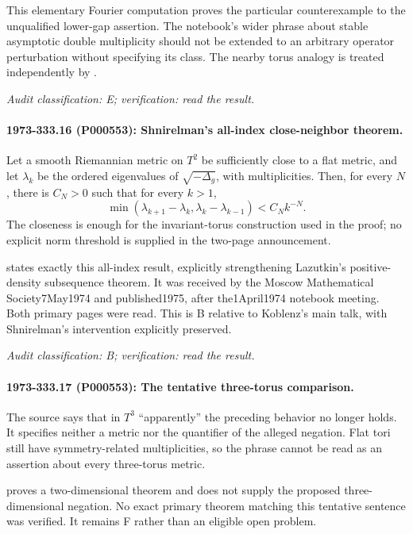 This elementary Fourier computation proves the particular counterexample to the unqualified lower-gap assertion. The notebook’s wider phrase about stable asymptotic double multiplicity should not be extended to an arbitrary operator perturbation without specifying its class. The nearby torus analogy is treated independently by \citet{shnirelman1975multiplicity}.

\emph{Audit classification: E; verification: read the result.}

\paragraph{1973-333.16 (P000553): Shnirelman’s all-index close-neighbor theorem.}
Let a smooth Riemannian metric on \(T^2\) be sufficiently close to a flat metric, and let \(\lambda_k\) be the ordered eigenvalues of \(\sqrt{-\Delta_g}\), with multiplicities. Then, for every \(N\), there is \(C_N>0\) such that for every \(k>1\), \[\min(\lambda_{k+1}-\lambda_k,\lambda_k-\lambda_{k-1})<C_N k^{-N}.\] The closeness is enough for the invariant-torus construction used in the proof; no explicit norm threshold is supplied in the two-page announcement.

\citet[Theorem and Lemmas1--3, pp.~265--266]{shnirelman1975multiplicity} states exactly this all-index result, explicitly strengthening Lazutkin’s positive-density subsequence theorem. It was received by the Moscow Mathematical Society7May1974 and published1975, after the1April1974 notebook meeting. Both primary pages were read. This is B relative to Koblenz’s main talk, with Shnirelman’s intervention explicitly preserved.

\emph{Audit classification: B; verification: read the result.}

\paragraph{1973-333.17 (P000553): The tentative three-torus comparison.}
The source says that in \(T^3\) “apparently” the preceding behavior no longer holds. It specifies neither a metric nor the quantifier of the alleged negation. Flat tori still have symmetry-related multiplicities, so the phrase cannot be read as an assertion about every three-torus metric.

\citet{shnirelman1975multiplicity} proves a two-dimensional theorem and does not supply the proposed three-dimensional negation. No exact primary theorem matching this tentative sentence was verified. It remains F rather than an eligible open problem.

